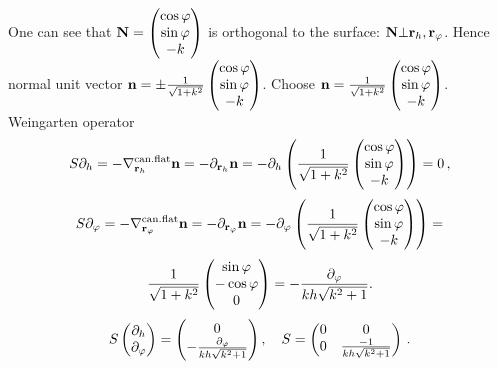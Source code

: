 \documentclass[12pt]{article}
\theoremstyle{theorem}
\numberwithin{equation}{section}
\begin{document}
{  One can see that  ${\bf N}=
      \begin{pmatrix}
        \cos \varphi\cr
        \sin\varphi\cr
        -k\cr
   \end{pmatrix}$ is orthogonal to the surface: ${\bf N}\bot {\bf r}_h,{\bf r}_\varphi$. Hence
   normal unit vector ${\bf n}=\pm
     {1\over {\sqrt {1+k^2}}}
      \begin{pmatrix}
        \cos \varphi\cr
        \sin\varphi\cr
        -k\cr
   \end{pmatrix}$. Choose ${\bf n}=
   {1\over {\sqrt {1+k^2}}}
      \begin{pmatrix}
        \cos \varphi\cr
        \sin\varphi\cr
        -k\cr
   \end{pmatrix}$.
     Weingarten operator
     \begin{equation*}\label{weingrartenforcylinder}
        S\partial_h=-\nabla^{\rm can.flat}_{{\bf r}_h}{\bf n}=-\partial_{{\bf r}_h} {\bf n}=
        -\partial_h
        \left(
        {1\over {\sqrt {1+k^2}}}
      \begin{pmatrix}
        \cos \varphi\cr
        \sin\varphi\cr
        -k\cr
   \end{pmatrix}
   \right)
        =0\,,
     \end{equation*}
\begin{equation*}\label{weingrartenforcylinder}
        S\partial_\varphi=-\nabla^{\rm can.flat}_{{\bf r}_\varphi}{\bf n}=-\partial_{{\bf r}_\varphi} {\bf n}=
        -\partial_\varphi
        \left(
{1\over {\sqrt {1+k^2}}}
      \begin{pmatrix}
        \cos \varphi\cr
        \sin\varphi\cr
        -k\cr
   \end{pmatrix}
   \right)
       =
       \end{equation*}
       \begin{equation*}
       {1\over {\sqrt {1+k^2}}}
       \begin{pmatrix}
        \sin\varphi \cr
        -\cos\varphi\cr
        0\cr
   \end{pmatrix}=-{\partial_\varphi\over kh\sqrt {k^2+1}}.
    \end{equation*}
\begin{equation}\label{weingrartenforcylinder2}
           S
   \begin{pmatrix}
        \p_h \cr
        \p_\varphi\cr
   \end{pmatrix}=
   \begin{pmatrix}
         0\cr
        -{\p_\varphi\over kh\sqrt {k^2+1}}\cr
   \end{pmatrix},\quad S=\begin{pmatrix}0&0\cr 0 &{-1\over kh\sqrt {k^2+1}}\end{pmatrix}\,.

\end{equation}}
\end{document}

